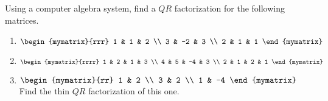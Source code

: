 \begin{enumialphparenastyle}
\begin{ex} Using a computer algebra system, find a $QR$ factorization for the
following matrices.

\begin{enumerate}
\item $\begin{mymatrix}{rrr}
1 & 1 & 2 \\ 
3 & -2 & 3 \\ 
2 & 1 & 1
\end{mymatrix} \ $

\item $\begin{mymatrix}{rrrr}
1 & 2 & 1 & 3 \\ 
4 & 5 & -4 & 3 \\ 
2 & 1 & 2 & 1
\end{mymatrix} \ $

\item $\begin{mymatrix}{rr}
1 & 2 \\ 
3 & 2 \\ 
1 & -4
\end{mymatrix} \allowbreak $ Find the thin $QR$ factorization of this one.
\end{enumerate}
\end{ex}

\end{enumialphparenastyle}